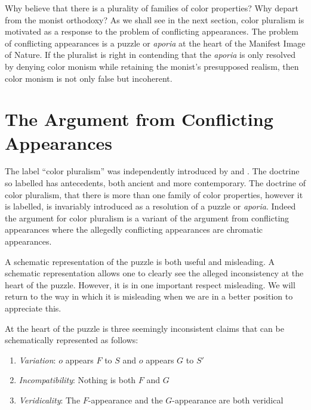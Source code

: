 \documentclass[12pt]{article}
\begin{document}
Why believe that there is a plurality of families of color properties? Why depart from the monist orthodoxy? As we shall see in the next section, color pluralism is motivated as a response to the problem of conflicting appearances. The problem of conflicting appearances is a puzzle or \emph{aporia} at the heart of the Manifest Image of Nature. If the pluralist is right in contending that the \emph{aporia} is only resolved by denying color monism while retaining the monist's presupposed realism, then color monism is not only false but incoherent.


\section{The Argument from Conflicting Appearances} %
\label{sec:the_argument_from_conflicting_appearances}

The label ``color pluralism'' was independently introduced by \citet{Mizrahi:2006zr} and \citet{Kalderon:2006tg}. The doctrine so labelled has antecedents, both ancient and more contemporary. The doctrine of color pluralism, that there is more than one family of color properties, however it is labelled, is invariably introduced as a resolution of a puzzle or \emph{aporia}. Indeed the argument for color pluralism is a variant of the argument from conflicting appearances where the allegedly conflicting appearances are chromatic appearances. 

A schematic representation of the puzzle is both useful and misleading. A schematic representation allows one to clearly see the alleged inconsistency at the heart of the puzzle. However, it is in one important respect misleading. We will return to the way in which it is misleading when we are in a better position to appreciate this.

At the heart of the puzzle is three seemingly inconsistent claims that can be schematically represented as follows:
\begin{enumerate}
	\item \emph{Variation}: \( o \) appears \( F \) to \( S \) and \( o \) appears \( G \) to \( S' \)
	\item \emph{Incompatibility}: Nothing is both \( F \) and \( G \)
	\item \emph{Veridicality}: The \( F \)-appearance and the \( G \)-appearance are both veridical
\end{enumerate}
\end{document}
